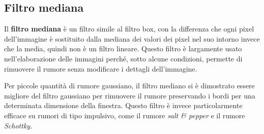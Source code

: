 \documentclass[../main.tex]{subfiles}
\begin{document}
\subsection{Filtro mediana}

Il \textbf{filtro mediana} è un filtro simile al filtro box, con la differenza che ogni pixel dell'immagine è sostituito dalla mediana dei valori dei pixel nel suo intorno invece che la media, quindi non è un filtro lineare. Questo filtro è largamente usato nell'elaborazione delle immagini perché, sotto alcune condizioni, permette di rimuovere il rumore senza modificare i dettagli dell'immagine.\cite{rezaee_2021}

Per piccole quantità di rumore gaussiano, il filtro mediano si è dimostrato essere migliore del filtro gaussiano per rimuovere il rumore preservando i bordi per una determinata dimensione della finestra.\cite{castro_2009} Questo filtro è invece particolarmente efficace su rumori di tipo impulsivo, come il rumore \textit{salt \& pepper} e il rumore \textit{Schottky}.\cite{arce_2004}\\
\end{document}
